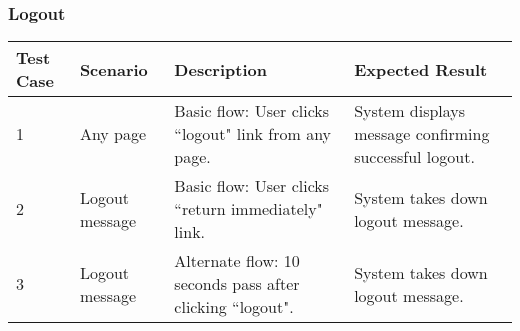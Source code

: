 \subsubsection{Logout}
\begin{table}[!h]
    \begin{tabular}{|l|l|l|l|}
        \hline
        Test Case & Scenario & Description & Expected Result \\
        \hline
        1 & Any page & Basic flow: User clicks ``logout" link from any page. & System displays message confirming successful logout. \\
        \hline
        2 & Logout message & Basic flow: User clicks ``return immediately" link. & System takes down logout message. \\
        \hline
        3 & Logout message & Alternate flow: 10 seconds pass after clicking ``logout". & System takes down logout message. \\
        \hline
    \end{tabular}
\end{table}

